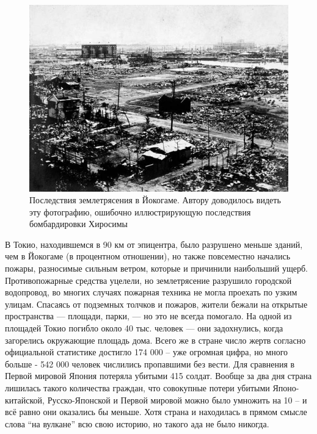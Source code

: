 \begin{figure}[h!tb] 
	\centering\includegraphics[scale=0.4]{Glava7/wXqFmTQB9Ms.jpg}
	\caption{Последствия землетрясения в Йокогаме. Автору доводилось видеть эту фотографию, ошибочно иллюстрирующую последствия бомбардировки Хиросимы}%
\end{figure}

В Токио, находившемся в 90 км от эпицентра, было разрушено меньше зданий, чем в Йокогаме (в процентном отношении), но также повсеместно начались пожары, разносимые сильным ветром, которые и причинили наибольший ущерб. Противопожарные средства уцелели, но землетрясение разрушило городской водопровод, во многих случаях пожарная техника не могла проехать по узким улицам. Спасаясь от подземных толчков и пожаров, жители бежали на открытые пространства — площади, парки, — но это не всегда помогало. На одной из площадей Токио погибло около 40 тыс. человек — они задохнулись, когда загорелись окружающие площадь дома. Всего же в стране число жертв согласно официальной статистике достигло 174 000 – уже огромная цифра, но много больше - 542 000 человек числились пропавшими без вести. Для сравнения в Первой мировой Япония потеряла убитыми 415 солдат. Вообще за два дня страна лишилась такого количества граждан, что совокупные потери убитыми Японо-китайской, Русско-Японской и Первой мировой можно было умножить на 10 – и всё равно они оказались бы меньше. Хотя страна и находилась в прямом смысле слова “на вулкане” всю свою историю, но такого ада не было никогда.

